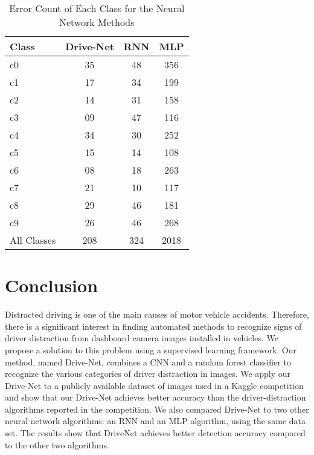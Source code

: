 \documentclass[conference,compsoc]{IEEEtran}
\begin{document}
\begin{table}[htbp]
\centering
\caption{Error Count of Each Class for the Neural Network Methods}%
\label{tab:drive-net.table.2}
\begin{tabular}{@{}lccc@{}}
\toprule
\rowcolor[HTML]{FFFFFF}
Class       & Drive-Net & RNN & MLP  \\ \midrule
c0          & 35        & 48  & 356  \\
c1          & 17        & 34  & 199  \\
c2          & 14        & 31  & 158  \\
c3          & 09        & 47  & 116  \\
c4          & 34        & 30  & 252  \\
c5          & 15        & 14  & 108  \\
c6          & 08        & 18  & 263  \\
c7          & 21        & 10  & 117  \\
c8          & 29        & 46  & 181  \\
c9          & 26        & 46  & 268  \\
\rowcolor[HTML]{EFEFEF}
All Classes & 208       & 324 & 2018 \\ \bottomrule
\end{tabular}
\end{table}

\section{Conclusion}
Distracted driving is one of the main causes of motor vehicle accidents. Therefore, there is a significant interest in finding automated methods to recognize signs of driver distraction from dashboard camera images installed in vehicles. We propose a solution to this problem using a supervised learning framework. Our method, named Drive-Net, combines a CNN and a random forest classifier to recognize the various categories of driver distraction in images. We apply our Drive-Net to a publicly available dataset of images used in a Kaggle competition and show that our Drive-Net achieves better accuracy than the driver-distraction algorithms reported in the competition. We also compared Drive-Net to two other neural network algorithms: an RNN and an MLP algorithm, using the same data set. The results show that DriveNet achieves better detection accuracy compared to the other two algorithms.



\end{document}
